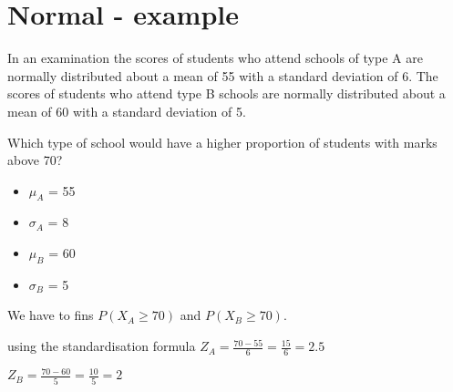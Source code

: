 \documentclass[]{report}
\begin{document}



\section{Normal - example}

In an examination the scores of students who attend schools of type A are
normally distributed about a mean of 55 with a standard deviation of 6. The
scores of students who attend type B schools are normally distributed about a
mean of 60 with a standard deviation of 5.

Which type of school would have a higher proportion of students with marks above 70?

\begin{itemize}
	\item $\mu_A$ = 55
	\item $\sigma_A$ = 8
	\item $\mu_B$ = 60
	\item $\sigma_B$ = 5
\end{itemize}

We have to fins $P(X_A \geq 70)$
and $P(X_B \geq 70)$.


using the standardisation formula
$Z_A = \frac{70 - 55}{6} = \frac{15}{6} = 2.5 $

$Z_B = \frac{70 - 60}{5} = \frac{10}{5} = 2 $
\end{document}
